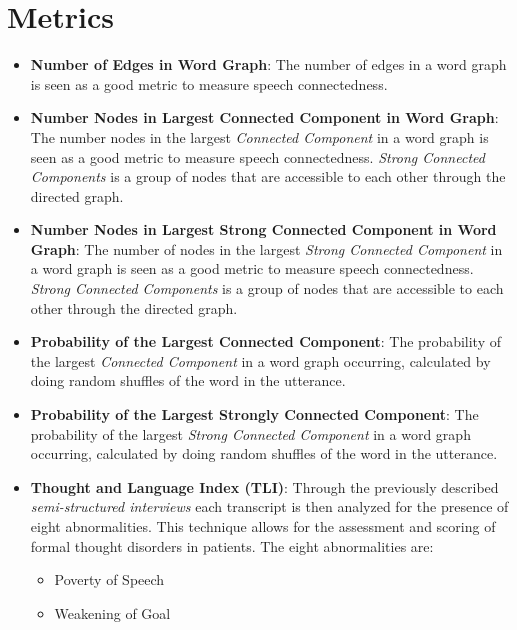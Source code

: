 \documentclass{Paper_Summary}
\begin{document}
\section{Metrics}
    \begin{itemize}
        \item \textbf{Number of Edges in Word Graph}: The number of edges in a word graph is seen as a good metric to measure speech connectedness.
        \item \textbf{Number Nodes in Largest Connected Component in Word Graph}: The number nodes in the largest \emph{Connected Component} in a word graph is seen as a good metric to measure speech connectedness. \emph{Strong Connected Components} is a group of nodes that are accessible to each other through the directed graph.
        \item \textbf{Number Nodes in Largest Strong Connected Component in Word Graph}: The number of nodes in the largest \emph{Strong Connected Component} in a word graph is seen as a good metric to measure speech connectedness. \emph{Strong Connected Components} is a group of nodes that are accessible to each other through the directed graph.
        \item \textbf{Probability of the Largest Connected Component}: The probability of the largest \emph{Connected Component} in a word graph occurring, calculated by doing random shuffles of the word in the utterance.
        \item \textbf{Probability of the Largest Strongly Connected Component}: The probability of the largest \emph{Strong Connected Component} in a word graph occurring, calculated by doing random shuffles of the word in the utterance.
        \item \textbf{Thought and Language Index (TLI)}: Through the previously described \emph{semi-structured interviews} each transcript is then analyzed for the presence of eight abnormalities. This technique allows for the assessment and scoring of formal thought disorders in patients. The eight abnormalities are:
        \begin{itemize}
            \item Poverty of Speech
            \item Weakening of Goal

\end{itemize}
\end{itemize}
\end{document}
